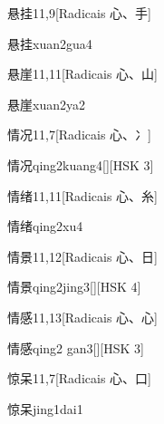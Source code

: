 \begin{entry}{悬挂}{11,9}[Radicais ⼼、⼿]
  \begin{phonetics}{悬挂}{xuan2gua4}
  \end{phonetics}
\end{entry}

\begin{entry}{悬崖}{11,11}[Radicais ⼼、⼭]
  \begin{phonetics}{悬崖}{xuan2ya2}
  \end{phonetics}
\end{entry}

\begin{entry}{情况}{11,7}[Radicais ⼼、⼎]
  \begin{phonetics}{情况}{qing2kuang4}[][HSK 3]
  \end{phonetics}
\end{entry}

\begin{entry}{情绪}{11,11}[Radicais ⼼、⽷]
  \begin{phonetics}{情绪}{qing2xu4}
  \end{phonetics}
\end{entry}

\begin{entry}{情景}{11,12}[Radicais ⼼、⽇]
  \begin{phonetics}{情景}{qing2jing3}[][HSK 4]
  \end{phonetics}
\end{entry}

\begin{entry}{情感}{11,13}[Radicais ⼼、⼼]
  \begin{phonetics}{情感}{qing2 gan3}[][HSK 3]
  \end{phonetics}
\end{entry}

\begin{entry}{惊呆}{11,7}[Radicais ⼼、⼝]
  \begin{phonetics}{惊呆}{jing1dai1}
  \end{phonetics}
\end{entry}

